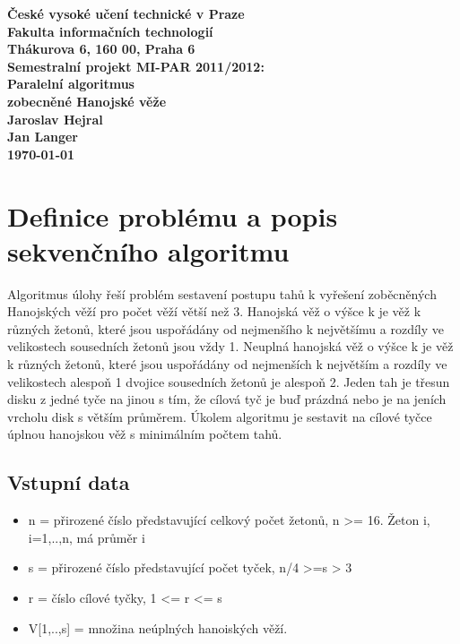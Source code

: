 \documentclass[12pt]{article}
\begin{document}

\begin{center}
\bf České vysoké učení technické v Praze\\[2mm]
	Fakulta informačních technologií\\[2mm]
	Thákurova 6, 160 00, Praha 6\\[15mm]
	\textbf{Semestralní projekt MI-PAR 2011/2012:\\
    Paralelní algoritmus \\
    zobecněné Hanojské věže}\\[5mm]
       Jaroslav Hejral\\
       Jan Langer\\[2mm]
\today\\[12mm]
\end{center}

\section{Definice problému a popis sekvenčního algoritmu}
Algoritmus úlohy řeší problém sestavení postupu tahů k vyřešení zoběcněných Hanojských věží pro počet věží větší než 3. Hanojská věž o výšce k je věž k různých žetonů, které jsou uspořádány od nejmenšího k největšímu a rozdíly ve velikostech sousedních žetonů jsou vždy 1. Neuplná hanojská věž o výšce k je věž k různých žetonů, které jsou uspořádány od nejmenších k největším a rozdíly ve velikostech alespoň 1 dvojice sousedních žetonů je alespoň 2. Jeden tah je třesun disku z jedné tyče na jinou s tím, že cílová tyč je buď prázdná nebo je na jeních vrcholu disk s větším průměrem. Úkolem algoritmu je sestavit na cílové tyčce úplnou hanojskou věž s minimálním počtem tahů.

\subsection{Vstupní data}
\begin{itemize}
\item n = přirozené číslo představující celkový počet žetonů, n >= 16. Žeton i, i=1,..,n, má průměr i
\item s = přirozené číslo představující počet tyček, n/4 >=s > 3
\item r = číslo cílové tyčky, 1 <= r <= s
\item V[1,..,s] = množina neúplných hanoiských věží.
\end{itemize}
\end{document}
